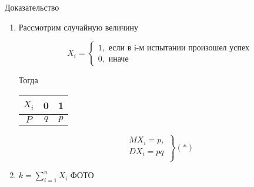 Доказательство

\begin{enumerate}
    \item Рассмотрим случайную величину

        \begin{equation*}
            X_i =
            \begin{cases}
                1, \text{ если в i-м испытании произошел успех} \\
                0, \text{ иначе}
            \end{cases}
        \end{equation*}

        Тогда

        \begin{table}[H]
            \centering
            \begin{tabular}{|c||c|c|}
                \hline
                $X_i$ & 0 & 1 \\
                \hline
                $P$ & $q$ & $p$ \\
                \hline
            \end{tabular}
        \end{table}

        \begin{equation*}
            \left.
            \begin{matrix}
                MX_i = p, \\
                DX_i = pq \\
            \end{matrix}
            \right\}
            (*)
        \end{equation*}

    \item $k = \sum_{i=1}^n X_i$
        ФОТО
\end{enumerate}

